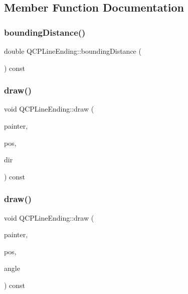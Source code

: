 \subsection{Member Function Documentation}
\mbox{\label{class_q_c_p_line_ending_a14fe390ddd590864ac66a60ed5278df5}} 
\subsubsection{\texorpdfstring{boundingDistance()}{boundingDistance()}}
{\footnotesize\ttfamily double Q\+C\+P\+Line\+Ending\+::bounding\+Distance (\begin{DoxyParamCaption}{ }\end{DoxyParamCaption}) const}

\mbox{\label{class_q_c_p_line_ending_a4f45db54f2aba03acf055e29aec1e8e7}} 
\subsubsection{\texorpdfstring{draw()}{draw()}\hspace{0.1cm}{\footnotesize\ttfamily [1/2]}}
{\footnotesize\ttfamily void Q\+C\+P\+Line\+Ending\+::draw (\begin{DoxyParamCaption}\item[{\mbox{\hyperlink{class_q_c_p_painter}{Q\+C\+P\+Painter}} $\ast$}]{painter,  }\item[{const \mbox{\hyperlink{class_q_c_p_vector2_d}{Q\+C\+P\+Vector2D}} \&}]{pos,  }\item[{const \mbox{\hyperlink{class_q_c_p_vector2_d}{Q\+C\+P\+Vector2D}} \&}]{dir }\end{DoxyParamCaption}) const}

\mbox{\label{class_q_c_p_line_ending_af7ac30a81ba85b9bded148c6ec387391}} 
\subsubsection{\texorpdfstring{draw()}{draw()}\hspace{0.1cm}{\footnotesize\ttfamily [2/2]}}
{\footnotesize\ttfamily void Q\+C\+P\+Line\+Ending\+::draw (\begin{DoxyParamCaption}\item[{\mbox{\hyperlink{class_q_c_p_painter}{Q\+C\+P\+Painter}} $\ast$}]{painter,  }\item[{const \mbox{\hyperlink{class_q_c_p_vector2_d}{Q\+C\+P\+Vector2D}} \&}]{pos,  }\item[{double}]{angle }\end{DoxyParamCaption}) const}


